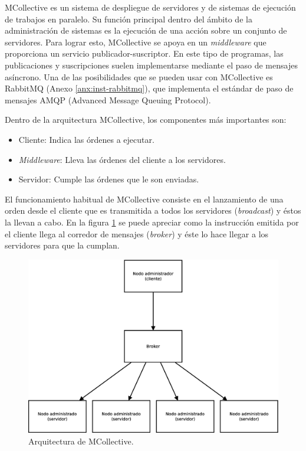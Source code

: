 MCollective es un sistema de despliegue de servidores y de sistemas de ejecución de trabajos en paralelo. Su función principal dentro del ámbito de la administración de sistemas es la ejecución de una acción sobre un conjunto de servidores. Para lograr esto, MCollective se apoya en un \emph{middleware} que proporciona un servicio publicador-suscriptor. En este tipo de programas, las publicaciones y suscripciones suelen implementarse mediante el paso de mensajes asíncrono. Una de las posibilidades que se pueden usar con MCollective es RabbitMQ (Anexo \ref{anx:inst-rabbitmq}), que implementa el estándar de paso de mensajes AMQP (Advanced Message Queuing Protocol).

Dentro de la arquitectura MCollective, los componentes más importantes son:
\begin{itemize}
\item Cliente: Indica las órdenes a ejecutar.
\item \emph{Middleware}: Lleva las órdenes del cliente a los servidores.
\item Servidor: Cumple las órdenes que le son enviadas.
\end{itemize}

El funcionamiento habitual de MCollective consiste en el lanzamiento de una orden desde el cliente que es transmitida a todos los servidores (\emph{broadcast}) y éstos la llevan a cabo. En la figura \ref{figure:arquitectura-mcollective} se puede apreciar como la instrucción emitida por el cliente llega al corredor de mensajes (\emph{broker}) y éste lo hace llegar a los servidores para que la cumplan.

\begin{figure} [!htbp]
  \centering
  \includegraphics[width=13.5cm]{figuras/Arquitectura_MCollective.eps}
  \caption{Arquitectura de MCollective.}
\label{figure:arquitectura-mcollective}
\end{figure}

